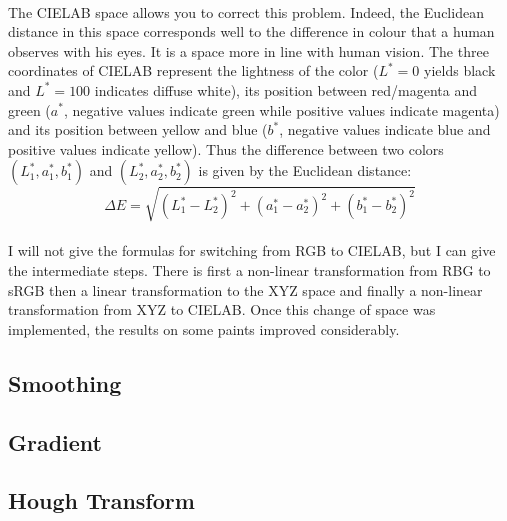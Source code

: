 \documentclass{article}
\begin{document}
	\paragraph{}
	The CIELAB space \cite{cielab} allows you to correct this problem. Indeed, the Euclidean distance in this space corresponds well to the difference in colour that a human observes with his eyes. It is a space more in line with human vision. The three coordinates of CIELAB represent the lightness of the color ($L^* = 0$ yields black and $L^* = 100$ indicates diffuse white), its position between red/magenta and green ($a^*$, negative values indicate green while positive values indicate magenta) and its position between yellow and blue ($b^*$, negative values indicate blue and positive values indicate yellow). Thus the difference between two colors $(L_1^*, a_1^*, b_1^*)$ and $(L_2^*, a_2^*, b_2^*)$ is given by the Euclidean distance:
	$$ \Delta E = \sqrt{(L_1^* - L_2^*)^2 + (a_1^* - a_2^*)^2 + (b_1^* - b_2^*)^2} $$
	
	\paragraph{}
	I will not give the formulas for switching from RGB to CIELAB, but I can give the intermediate steps. There is first a non-linear transformation from RBG to sRGB then a linear transformation to the XYZ space and finally a non-linear transformation from XYZ to CIELAB. Once this change of space was implemented, the results on some paints improved considerably.
	
	\subsection{Smoothing}
	
	\subsection{Gradient}
	
	\subsection{Hough Transform}
	
\end{document}
